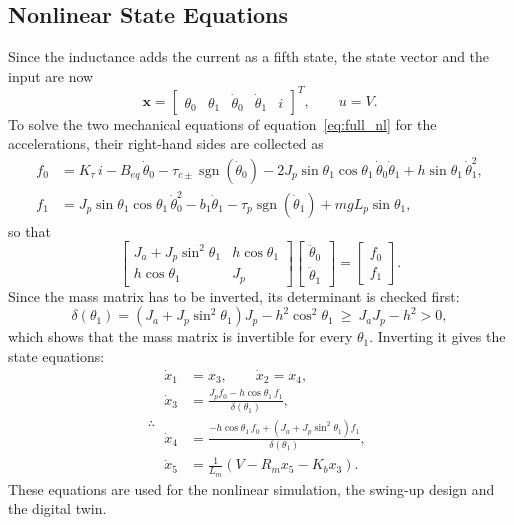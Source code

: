 \documentclass[a4paper,11pt]{article}
\newcommand{\sgn}{\operatorname{sgn}}
\begin{document}
\subsection{Nonlinear State Equations}
Since the inductance adds the current as a fifth state, the state vector and the input are now
\begin{equation}
  \mathbf{x} = \begin{bmatrix} \theta_0 & \theta_1 & \dot\theta_0 & \dot\theta_1 & i \end{bmatrix}^T, \qquad u = V .
\end{equation}
To solve the two mechanical equations of equation~\ref{eq:full_nl} for the accelerations, their right-hand sides are collected as
\begin{align}
  f_0 &= K_\tau\, i - B_{eq}\, \dot\theta_0 - \tau_{c\pm} \sgn(\dot\theta_0) - 2 J_p \sin\theta_1 \cos\theta_1\, \dot\theta_0 \dot\theta_1 + h \sin\theta_1\, \dot\theta_1^2 ,\\
  f_1 &= J_p \sin\theta_1 \cos\theta_1\, \dot\theta_0^2 - b_1 \dot\theta_1 - \tau_p \sgn(\dot\theta_1) + m g L_p \sin\theta_1 ,
\end{align}
so that
\begin{equation}
  \begin{bmatrix} J_a + J_p \sin^2\theta_1 & h \cos\theta_1 \\ h \cos\theta_1 & J_p \end{bmatrix}
  \begin{bmatrix} \ddot\theta_0 \\ \ddot\theta_1 \end{bmatrix}
  = \begin{bmatrix} f_0 \\ f_1 \end{bmatrix}.
\end{equation}
Since the mass matrix has to be inverted, its determinant is checked first:
\begin{equation}
  \delta(\theta_1) = \left(J_a + J_p \sin^2\theta_1\right) J_p - h^2 \cos^2\theta_1 \ \ge\ J_a J_p - h^2 > 0 ,
\end{equation}
which shows that the mass matrix is invertible for every $\theta_1$. Inverting it gives the state equations:
\begin{equation}
\therefore\;\boxed{
\begin{aligned}
  \dot x_1 &= x_3, \qquad \dot x_2 = x_4,\\
  \dot x_3 &= \frac{J_p f_0 - h \cos\theta_1\, f_1}{\delta(\theta_1)},\\
  \dot x_4 &= \frac{-h \cos\theta_1\, f_0 + \left(J_a + J_p \sin^2\theta_1\right) f_1}{\delta(\theta_1)},\\
  \dot x_5 &= \frac{1}{L_m}\left(V - R_m x_5 - K_b x_3\right).
\end{aligned}
}
\label{eq:full_explicit}
\end{equation}
These equations are used for the nonlinear simulation, the swing-up design and the digital twin.
\end{document}
